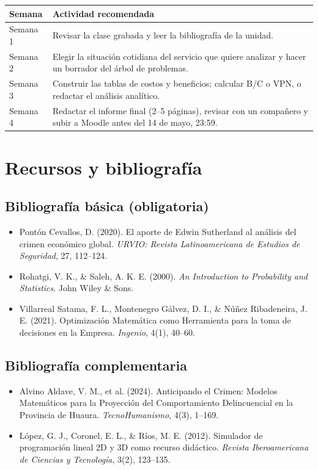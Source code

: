 \documentclass[11pt, a4paper]{article}
\begin{document}
\begin{center}
\begin{tabular}{@{}lp{9cm}@{}}
\toprule
\textbf{Semana} & \textbf{Actividad recomendada}\\
\midrule
Semana 1 & Revisar la clase grabada y leer la bibliograf\'ia de la unidad.\\
Semana 2 & Elegir la situaci\'on cotidiana del servicio que quiere analizar y hacer un borrador del \'arbol de problemas.\\
Semana 3 & Construir las tablas de costos y beneficios; calcular B/C o VPN, o redactar el an\'alisis anal\'itico.\\
Semana 4 & Redactar el informe final (2--5 p\'aginas), revisar con un compa\~nero y subir a Moodle antes del 14 de mayo, 23:59.\\
\bottomrule
\end{tabular}
\end{center}

\section{Recursos y bibliograf\'ia}

\subsection{Bibliograf\'ia b\'asica (obligatoria)}
\begin{itemize}[leftmargin=1.5em]
\item Pont\'on Cevallos, D. (2020). El aporte de Edwin Sutherland al an\'alisis del crimen econ\'omico global. \textit{URVIO: Revista Latinoamericana de Estudios de Seguridad}, 27, 112--124.
\item Rohatgi, V. K., \& Saleh, A. K. E. (2000). \textit{An Introduction to Probability and Statistics}. John Wiley \& Sons.
\item Villarreal Satama, F. L., Montenegro G\'alvez, D. I., \& N\'u\~nez Ribadeneira, J. E. (2021). Optimizaci\'on Matem\'atica como Herramienta para la toma de decisiones en la Empresa. \textit{Ingenio}, 4(1), 40--60.
\end{itemize}

\subsection{Bibliograf\'ia complementaria}
\begin{itemize}[leftmargin=1.5em]
\item Alvino Aldave, V. M., et al. (2024). Anticipando el Crimen: Modelos Matem\'aticos para la Proyecci\'on del Comportamiento Delincuencial en la Provincia de Huaura. \textit{TecnoHumanismo}, 4(3), 1--169.
\item L\'opez, G. J., Coronel, E. L., \& R\'ios, M. E. (2012). Simulador de programaci\'on lineal 2D y 3D como recurso did\'actico. \textit{Revista Iberoamericana de Ciencias y Tecnolog\'ia}, 3(2), 123--135.
\end{itemize}
\end{document}
